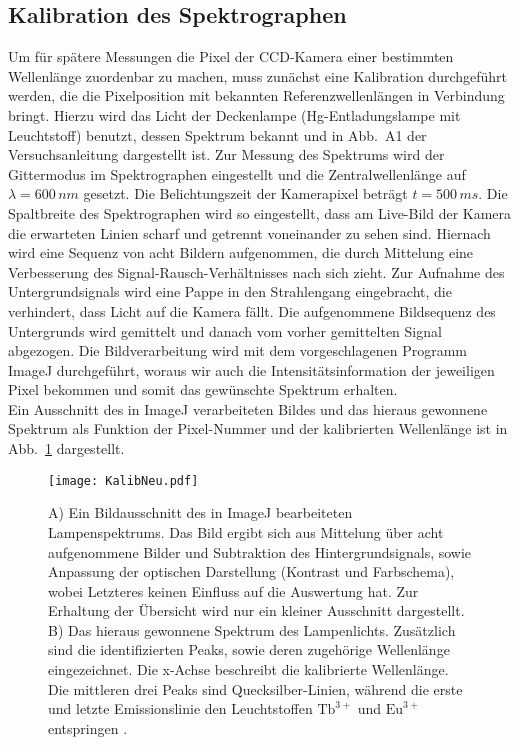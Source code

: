 \subsection{\label{subsec:A1}Kalibration des Spektrographen}
Um für spätere Messungen die Pixel der CCD-Kamera einer bestimmten Wellenlänge zuordenbar zu machen, 
muss zunächst eine Kalibration durchgeführt werden, die die Pixelposition mit bekannten 
Referenzwellenlängen in Verbindung bringt. Hierzu wird das Licht der Deckenlampe (Hg-Entladungslampe mit Leuchtstoff) 
benutzt, dessen Spektrum bekannt und in Abb.~A1 der Versuchsanleitung dargestellt ist.
Zur Messung des Spektrums wird der Gittermodus im Spektrographen eingestellt und die Zentralwellenlänge auf 
$\lambda = 600\,\si{nm}$ gesetzt. Die Belichtungszeit der Kamerapixel beträgt $t = 500\,\si{ms}$. 
Die Spaltbreite des Spektrographen wird so eingestellt, dass am Live-Bild der Kamera die erwarteten Linien
scharf und getrennt voneinander zu sehen sind. Hiernach wird eine Sequenz von acht Bildern aufgenommen, die 
durch Mittelung eine Verbesserung des Signal-Rausch-Verhältnisses nach sich zieht. Zur Aufnahme des Untergrundsignals 
wird eine Pappe in den Strahlengang eingebracht, die verhindert, dass Licht auf die Kamera fällt. 
Die aufgenommene Bildsequenz des Untergrunds wird gemittelt und danach vom vorher gemittelten Signal 
abgezogen. 
Die Bildverarbeitung wird mit dem vorgeschlagenen Programm ImageJ durchgeführt, woraus wir 
auch die Intensitätsinformation der jeweiligen Pixel bekommen und somit das gewünschte Spektrum 
erhalten. \\ 
Ein Ausschnitt des in ImageJ verarbeiteten Bildes 
und das hieraus gewonnene Spektrum als Funktion der Pixel-Nummer 
und der kalibrierten Wellenlänge ist in Abb.~\ref{fig:kalib} dargestellt.
\begin{figure}[h!]
    \centering
    \texttt{[image: KalibNeu.pdf]}
    \caption{\label{fig:kalib}A) Ein Bildausschnitt des in ImageJ bearbeiteten Lampenspektrums. Das Bild ergibt sich aus 
    Mittelung über acht aufgenommene Bilder und Subtraktion des Hintergrundsignals, sowie Anpassung der optischen Darstellung 
    (Kontrast und Farbschema), wobei Letzteres keinen Einfluss auf die Auswertung hat. Zur Erhaltung der Übersicht wird nur ein 
    kleiner Ausschnitt dargestellt. 
    B) Das hieraus gewonnene Spektrum des Lampenlichts. Zusätzlich sind die identifizierten Peaks, sowie deren zugehörige 
    Wellenlänge eingezeichnet. Die x-Achse beschreibt die kalibrierte Wellenlänge. Die mittleren drei Peaks sind 
    Quecksilber-Linien, während die erste und letzte Emissionslinie den Leuchtstoffen $\text{Tb}^{3+}$ und 
    $\text{Eu}^{3+}$ entspringen \cite{Anleitung}.}
\end{figure}\FloatBarrier
